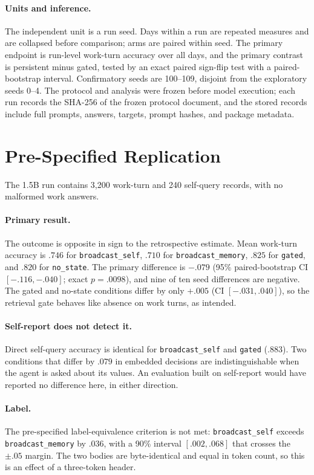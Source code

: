 \documentclass[11pt]{article}
\begin{document}
\paragraph{Units and inference.} The independent unit is a run seed. Days within a run are repeated measures and are collapsed before comparison; arms are paired within seed. The primary endpoint is run-level work-turn accuracy over all days, and the primary contrast is persistent minus gated, tested by an exact paired sign-flip test with a paired-bootstrap interval. Confirmatory seeds are 100--109, disjoint from the exploratory seeds 0--4. The protocol and analysis were frozen before model execution; each run records the SHA-256 of the frozen protocol document, and the stored records include full prompts, answers, targets, prompt hashes, and package metadata.

\section{Pre-Specified Replication}
\label{sec:main}
The 1.5B run contains 3,200 work-turn and 240 self-query records, with no malformed work answers.

\paragraph{Primary result.} The outcome is opposite in sign to the retrospective estimate. Mean work-turn accuracy is $.746$ for \texttt{broadcast\_self}, $.710$ for \texttt{broadcast\_memory}, $.825$ for \texttt{gated}, and $.820$ for \texttt{no\_state}. The primary difference is $-.079$ (95\% paired-bootstrap CI $[-.116,-.040]$; exact $p=.0098$), and nine of ten seed differences are negative. The gated and no-state conditions differ by only $+.005$ (CI $[-.031,.040]$), so the retrieval gate behaves like absence on work turns, as intended.

\paragraph{Self-report does not detect it.} Direct self-query accuracy is identical for \texttt{broadcast\_self} and \texttt{gated} ($.883$). Two conditions that differ by $.079$ in embedded decisions are indistinguishable when the agent is asked about its values. An evaluation built on self-report would have reported no difference here, in either direction.

\paragraph{Label.} The pre-specified label-equivalence criterion is not met: \texttt{broadcast\_self} exceeds \texttt{broadcast\_memory} by $.036$, with a 90\% interval $[.002,.068]$ that crosses the $\pm.05$ margin. The two bodies are byte-identical and equal in token count, so this is an effect of a three-token header.
\end{document}
